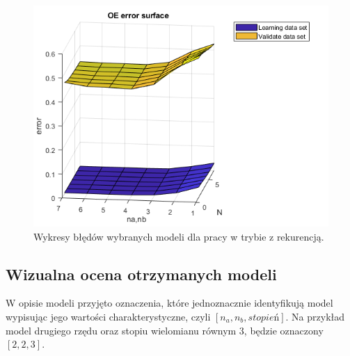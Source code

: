 \begin{figure}[H]
\centering
\includegraphics[width=15cm]{images/d_error_oe_ex.png}
\caption{Wykresy błędów wybranych modeli dla pracy w trybie z rekurencją.}
\label{fig:d_error_oe_ex}
\end{figure}
\subsection{Wizualna ocena otrzymanych modeli}
W opisie modeli przyjęto oznaczenia, które jednoznacznie identyfikują model wypisując jego wartości charakterystyczne, czyli $[n_{a},n_{b},stopień]$. Na przykład model drugiego rzędu oraz stopiu wielomianu równym 3, będzie oznaczony $[2,2,3]$.

